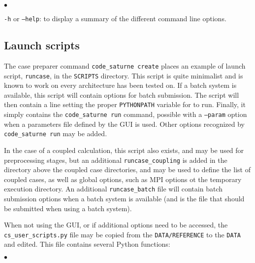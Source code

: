 {{{\begin{list}{$\bullet$}{}
\item \texttt{-h} or \texttt{--help}: to display a summary of the different
command line options.
\end{list}

\subsection{Launch scripts}
\label{sec:prg_runcase}%

The case preparer command \texttt{code\_saturne~create} places an example of launch script,
\texttt{runcase}, in the \texttt{SCRIPTS} directory. This script is quite minimalist and is known to work on every architecture \CS has been tested on.
If a batch system is available, this script will contain options
for batch submission.
The script will then contain a line setting the proper \texttt{PYTHONPATH}
variable for \CS to run.
Finally, it simply contains the \texttt{code\_saturne run}  command,
possible with a \texttt{--param} option when a parameters file
defined by the GUI is used. Other options recognized by
\texttt{code\_saturne run} may be added.

In the case of a coupled calculation, this script also exists, and
may be used for preprocessing stages, but an additional
\texttt{runcase\_coupling} is added in the directory above the coupled case
directories, and may be used to define the list of coupled cases,
as well as global options, such as MPI options ot the temporary
execution directory. An additional \texttt{runcase\_batch} file will
contain batch submission options when a batch system is available
(and is the file that should be submitted when using a batch system).

When not using the GUI, or if additional options need to be accessed,
the \texttt{cs\_user\_scripts.py} file may be copied from
the \texttt{DATA/REFERENCE} to the \texttt{DATA} and edited.
This file contains several Python functions:

\begin{list}{$\bullet$}{}


\end{list}}}}
